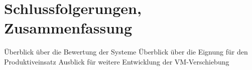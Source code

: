 \documentclass[draft,journal]{IEEEtran}
\begin{document}
\section{Schlussfolgerungen, Zusammenfassung}
Überblick über die Bewertung der Systeme
Überblick über die Eignung für den Produktiveinsatz
Ausblick für weitere Entwicklung der VM-Verschiebung


\end{document}
